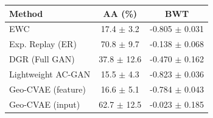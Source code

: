 \begin{tabular}{lcc}
\toprule
\textbf{Method} & \textbf{AA (\%)} & \textbf{BWT} \\
\midrule
EWC & 17.4 $\pm$ 3.2 & -0.805 $\pm$ 0.031 \\
Exp. Replay (ER) & 70.8 $\pm$ 9.7 & -0.138 $\pm$ 0.068 \\
DGR (Full GAN) & 37.8 $\pm$ 12.6 & -0.470 $\pm$ 0.162 \\
Lightweight AC-GAN & 15.5 $\pm$ 4.3 & -0.823 $\pm$ 0.036 \\
Geo-CVAE (feature) & 16.6 $\pm$ 5.1 & -0.784 $\pm$ 0.043 \\
Geo-CVAE (input) & 62.7 $\pm$ 12.5 & -0.023 $\pm$ 0.185 \\
\bottomrule
\end{tabular}
